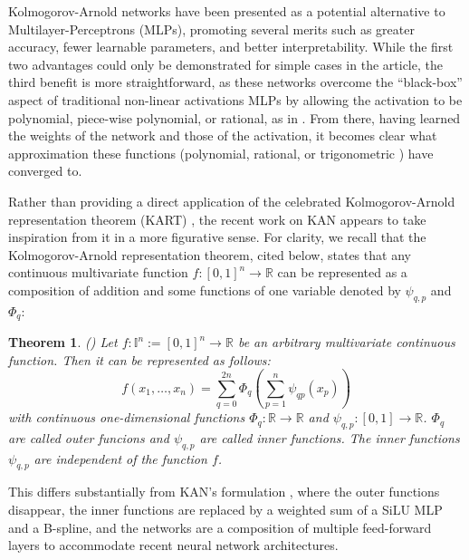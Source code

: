 \documentclass{article} %
\theoremstyle{plain}
\newtheorem{theorem}{Theorem}[section]
\theoremstyle{definition}
\theoremstyle{remark}
\begin{document}
Kolmogorov-Arnold networks \cite{liu2025kan} have been presented as a potential alternative to Multilayer-Perceptrons (MLPs), promoting several merits such as greater accuracy, fewer learnable parameters, and better interpretability. While the first two advantages could only be demonstrated for simple cases in the \citep{liu2025kan} article, the third benefit is more straightforward, as these networks overcome the “black-box” aspect of traditional non-linear activations MLPs by allowing the activation to be polynomial, piece-wise polynomial, or rational, as in \cite{yang2025kolmogorovarnold}. From there, having learned the weights of the network and those of the activation, it becomes clear what approximation these functions (polynomial, rational, or trigonometric ) have converged to.

Rather than providing a direct application of the celebrated Kolmogorov-Arnold representation theorem (KART) \cite{kolmogorov1957representation, arnold1959predstavlenii},
the recent work on KAN \cite{liu2025kan} appears to take inspiration from it in a more figurative sense. For clarity, we recall that the Kolmogorov-Arnold representation theorem, cited below, states that any continuous multivariate function $f \colon [0,1]^{n}\to \mathbb {R}$ can be represented as a composition of addition and some functions of one variable denoted by $\psi_{q,p}$ and $\Phi_q$:

\begin{theorem}
\label{thm:KART}
(\citet{arnold2009representation, arnold2009functions}) Let $f: \mathbb{I}^n:=[0,1]^n \rightarrow \mathbb{R}$ be an arbitrary multivariate continuous function. Then it can be represented as follows:
\begin{equation}
\label{eq:KART}
    f\left(x_1, \ldots, x_n\right)=\sum_{q=0}^{2 n} \Phi_q\left(\sum_{p=1}^n \psi_{qp}\left(x_p\right)\right)
\end{equation}
with continuous one-dimensional functions $\Phi_q \colon \mathbb {R} \to \mathbb {R}$ and $\psi_{q, p} \colon [0,1] \to \mathbb {R}$. $\Phi_q$ are called outer funcions and $\psi_{q, p}$ are called inner functions. The inner functions $\psi_{q, p}$ are independent of the function $f$.
\end{theorem} 
This differs substantially from KAN's formulation \cite{liu2025kan}, where the outer functions disappear, the inner functions are replaced by a weighted sum of a SiLU MLP \cite{elfwing2018sigmoid} and a B-spline, and the networks are a composition of multiple feed-forward layers to accommodate recent neural network architectures.
\end{document}

